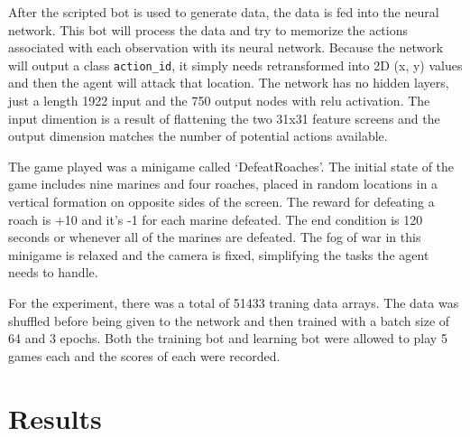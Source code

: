 \documentclass{amsart}
\theoremstyle{definition}
\begin{document}
After the scripted bot is used to generate data, the data is fed into the neural network.
This bot will process the data and try to memorize the actions associated with each observation with its neural network.
Because the network will output a class {\tt action\_id}, it simply needs retransformed into 2D (x, y) values and then the agent will attack that location.
The network has no hidden layers, just a length 1922 input and the 750 output nodes with relu activation.
The input dimention is a result of flattening the two 31x31 feature screens and the output dimension matches the number of potential actions available.

The game played was a minigame called `DefeatRoaches'.
The initial state of the game includes nine marines and four roaches, placed in random locations in a vertical formation on opposite sides of the screen.
The reward for defeating a roach is +10 and it's -1 for each marine defeated.
The end condition is 120 seconds or whenever all of the marines are defeated.
The fog of war in this minigame is relaxed and the camera is fixed, simplifying the tasks the agent needs to handle.

For the experiment, there was a total of 51433 traning data arrays.
The data was shuffled before being given to the network and then trained with a batch size of 64 and 3 epochs.
Both the training bot and learning bot were allowed to play 5 games each and the scores of each were recorded.










\section{Results}

\end{document}
